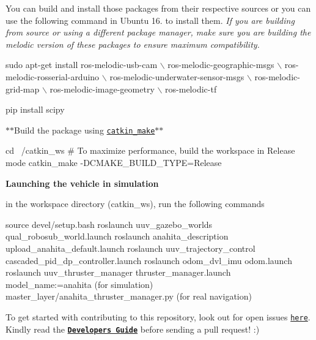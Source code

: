 You can build and install those packages from their respective sources or you can use the following command in Ubuntu 16. to install them. {\itshape If you are building from source or using a different package manager, make sure you are building the melodic version of these packages to ensure maximum compatibility.}


\begin{DoxyCode}
sudo apt-get install ros-melodic-usb-cam \(\backslash\)
                     ros-melodic-geographic-msgs \(\backslash\)
                     ros-melodic-rosserial-arduino \(\backslash\)
                     ros-melodic-underwater-sensor-msgs \(\backslash\)
                     ros-melodic-grid-map \(\backslash\)
                     ros-melodic-image-geometry \(\backslash\)
                     ros-melodic-tf

pip install scipy
\end{DoxyCode}



\begin{DoxyEnumerate}
\item $\ast$$\ast$\+Build the package using \href{http://wiki.ros.org/catkin/commands/catkin_make}{\tt {\ttfamily catkin\+\_\+make}}$\ast$$\ast$ 
\begin{DoxyCode}
cd ~/catkin\_ws
# To maximize performance, build the workspace in Release mode
catkin\_make -DCMAKE\_BUILD\_TYPE=Release
\end{DoxyCode}

\item {\bfseries Launching the vehicle in simulation}
\end{DoxyEnumerate}

in the workspace directory (catkin\+\_\+ws), run the following commands 
\begin{DoxyCode}
source devel/setup.bash
roslaunch uuv\_gazebo\_worlds qual\_robosub\_world.launch 
roslaunch anahita\_description upload\_anahita\_default.launch
roslaunch uuv\_trajectory\_control cascaded\_pid\_dp\_controller.launch
roslaunch odom\_dvl\_imu odom.launch
roslaunch uuv\_thruster\_manager thruster\_manager.launch model\_name:=anahita (for simulation)
master\_layer/anahita\_thruster\_manager.py (for real navigation) 
\end{DoxyCode}


To get started with contributing to this repository, look out for open issues \href{https://github.com/AUV-IITK/auv2018/issues}{\tt here}. Kindly read the \href{https://github.com/AUV-IITK/AUVWiki/wiki/Developers-Guide}{\tt {\bfseries Developer\textquotesingle{}s Guide}} before sending a pull request! \+:) 